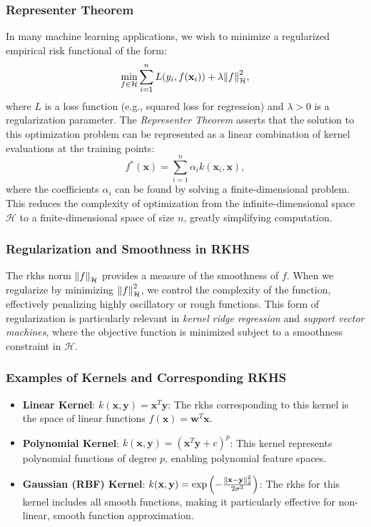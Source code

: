 \subsubsection{Representer Theorem}

In many machine learning applications, we wish to minimize a regularized empirical risk functional of the form:
\[
\min_{f \in \mathcal{H}} \sum_{i=1}^n L(y_i, f(\mathbf{x}_i)) + \lambda \norm{f}_{\mathcal{H}}^2,
\]
where $L$ is a loss function (e.g., squared loss for regression) and $\lambda > 0$ is a regularization parameter. The \textit{Representer Theorem} asserts that the solution to this optimization problem can be represented as a linear combination of kernel evaluations at the training points:
\[
f^*(\mathbf{x}) = \sum_{i=1}^n \alpha_i k(\mathbf{x}_i, \mathbf{x}),
\]
where the coefficients $\alpha_i$ can be found by solving a finite-dimensional problem. This reduces the complexity of optimization from the infinite-dimensional space $\mathcal{H}$ to a finite-dimensional space of size $n$, greatly simplifying computation.

\subsubsection{Regularization and Smoothness in RKHS}

The \ac{rkhs} norm $\norm{f}_{\mathcal{H}}$ provides a measure of the smoothness of $f$. When we regularize by minimizing $\norm{f}_{\mathcal{H}}^2$, we control the complexity of the function, effectively penalizing highly oscillatory or rough functions. This form of regularization is particularly relevant in \textit{kernel ridge regression} and \textit{support vector machines}, where the objective function is minimized subject to a smoothness constraint in $\mathcal{H}$.

\subsubsection{Examples of Kernels and Corresponding RKHS}

\begin{itemize}
    \item \textbf{Linear Kernel}: $k(\mathbf{x}, \mathbf{y}) = \mathbf{x}^T \mathbf{y}$: The \ac{rkhs} corresponding to this kernel is the space of linear functions $f(\mathbf{x}) = \mathbf{w}^T \mathbf{x}$.
    \item \textbf{Polynomial Kernel}: $k(\mathbf{x}, \mathbf{y}) = (\mathbf{x}^T \mathbf{y} + c)^p$: This kernel represents polynomial functions of degree $p$, enabling polynomial feature spaces.
    \item \textbf{Gaussian (RBF) Kernel}: $k(\mathbf{x}, \mathbf{y}) = \exp\left(-\frac{\norm{\mathbf{x} - \mathbf{y}}_2^2}{2\sigma^2}\right)$: The \ac{rkhs} for this kernel includes all smooth functions, making it particularly effective for non-linear, smooth function approximation.  
\end{itemize}


